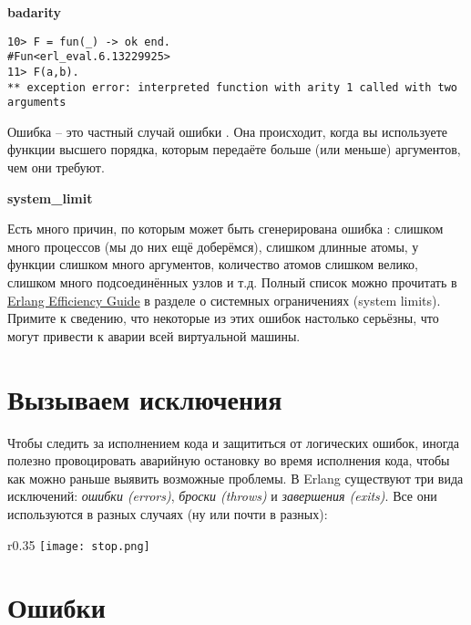 \textbf{badarity}
\begin{lstlisting}[style=erlang]
10> F = fun(_) -> ok end.
#Fun<erl_eval.6.13229925>
11> F(a,b).
** exception error: interpreted function with arity 1 called with two arguments
\end{lstlisting}
Ошибка  \--- это частный случай ошибки . 
Она происходит, когда вы используете функции высшего порядка, которым передаёте больше (или меньше) аргументов, чем они требуют.
\blankline

\textbf{system\_limit}

Есть много причин, по которым может быть сгенерирована ошибка : слишком много процессов (мы до них ещё доберёмся), слишком длинные атомы, у функции слишком много аргументов, количество атомов слишком велико, слишком много подсоединённых узлов и т.д.
Полный список можно прочитать в \href{http://www.erlang.org/doc/efficiency_guide/advanced.html#id2265856}{Erlang Efficiency Guide} в разделе о системных ограничениях (system limits).
Примите к сведению, что некоторые из этих ошибок настолько серьёзны, что могут привести к аварии всей виртуальной машины.

\section{Вызываем исключения}
\label{raising-exceptions}
Чтобы следить за исполнением кода и защититься от логических ошибок, иногда полезно провоцировать аварийную остановку во время исполнения кода, чтобы как можно раньше выявить возможные проблемы.
В Erlang существуют три вида исключений: \emph{ошибки (errors)}, \emph{броски (throws)} и \emph{завершения (exits)}. Все они используются в разных случаях (ну или почти в разных):

\begin{wrapfigure}{r}{0.35\linewidth}
    \texttt{[image: stop.png]}
\end{wrapfigure}

\section{Ошибки}
\label{errors}
